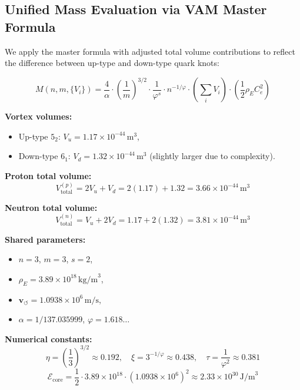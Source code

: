 \subsection{Unified Mass Evaluation via VAM Master Formula}

We apply the master formula with adjusted total volume contributions to reflect the difference between up-type and down-type quark knots:

\begin{equation}
\boxed{
M(n, m, \{V_i\}) = \frac{4}{\alpha} \cdot \left( \frac{1}{m} \right)^{3/2}
\cdot \frac{1}{\varphi^s} \cdot n^{-1/\varphi}
\cdot \left( \sum_i V_i \right)
\cdot \left( \frac{1}{2} \rho_{\scriptscriptstyle\boldsymbol\!E}C_e^2 \right)
}
\end{equation}

\textbf{Vortex volumes:}
\begin{itemize}
    \item Up-type \( 5_2 \): \( V_u = 1.17 \times 10^{-44} \, \text{m}^3 \),
    \item Down-type \( 6_1 \): \( V_d = 1.32 \times 10^{-44} \, \text{m}^3 \) (slightly larger due to complexity).
\end{itemize}

\textbf{Proton total volume:}
\[
V_\text{total}^{(p)} = 2V_u + V_d = 2(1.17) + 1.32 = 3.66 \times 10^{-44} \, \text{m}^3
\]

\textbf{Neutron total volume:}
\[
V_\text{total}^{(n)} = V_u + 2V_d = 1.17 + 2(1.32) = 3.81 \times 10^{-44} \, \text{m}^3
\]

\textbf{Shared parameters:}
\begin{itemize}
    \item \( n = 3 \), \( m = 3 \), \( s = 2 \),
    \item \( \rho_{\scriptscriptstyle\boldsymbol\!E}= 3.89 \times 10^{18} \, \text{kg/m}^3 \),
    \item \( \mathbf{v}_{\scriptscriptstyle\boldsymbol{\circlearrowleft}} = 1.0938 \times 10^6 \, \text{m/s} \),
    \item \( \alpha = 1/137.035999 \), \quad \( \varphi = 1.618\ldots \)
\end{itemize}

\textbf{Numerical constants:}
\[
\eta = \left(\frac{1}{3}\right)^{3/2} \approx 0.192, \quad
\xi = 3^{-1/\varphi} \approx 0.438, \quad
\tau = \frac{1}{\varphi^2} \approx 0.381
\]
\[
\mathcal{E}_\text{core} = \frac{1}{2} \cdot 3.89 \times 10^{18} \cdot (1.0938 \times 10^6)^2 \approx 2.33 \times 10^{30} \, \text{J/m}^3
\]

